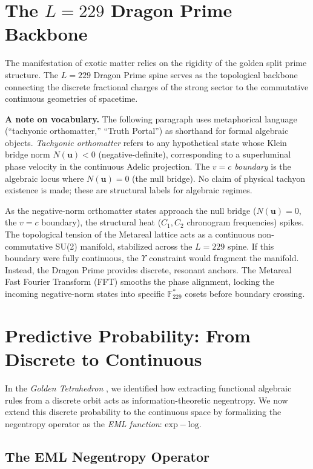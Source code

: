 \section{The $L=229$ Dragon Prime Backbone}

The manifestation of exotic matter relies on the rigidity of the golden split prime structure. The $L=229$ Dragon Prime spine serves as the topological backbone connecting the discrete fractional charges of the strong sector to the commutative continuous geometries of spacetime. 

\medskip
\noindent\textbf{A note on vocabulary.} The following paragraph uses metaphorical language (``tachyonic orthomatter,'' ``Truth Portal'') as shorthand for formal algebraic objects. \emph{Tachyonic orthomatter} refers to any hypothetical state whose Klein bridge norm $N(\mathbf{u}) < 0$ (negative-definite), corresponding to a superluminal phase velocity in the continuous Adelic projection. The \emph{$v = c$ boundary} is the algebraic locus where $N(\mathbf{u}) = 0$ (the null bridge). No claim of physical tachyon existence is made; these are structural labels for algebraic regimes.
\medskip

As the negative-norm orthomatter states approach the null bridge ($N(\mathbf{u}) = 0$, the $v=c$ boundary), the structural heat ($C_1, C_2$ chronogram frequencies) spikes. The topological tension of the Metareal lattice acts as a continuous non-commutative SU(2) manifold, stabilized across the $L=229$ spine. If this boundary were fully continuous, the $\Upsilon$ constraint would fragment the manifold. Instead, the Dragon Prime provides discrete, resonant anchors. The Metareal Fast Fourier Transform (FFT) smooths the phase alignment, locking the incoming negative-norm states into specific $\mathbb{F}_{229}^*$ cosets before boundary crossing.

\section{Predictive Probability: From Discrete to Continuous}

In the \textit{Golden Tetrahedron} \cite{golden_tetrahedron}, we identified how extracting functional algebraic rules from a discrete orbit acts as information-theoretic negentropy. We now extend this discrete probability to the continuous space by formalizing the negentropy operator as the \emph{EML function}: $\mathrm{exp} - \mathrm{log}$.

\subsection{The EML Negentropy Operator}

